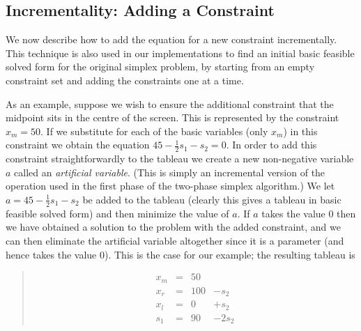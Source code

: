 \documentclass{uist96}
\begin{document}
\subsection{Incrementality: Adding a Constraint}
\label{adding-constraints}

We now describe how to add the equation for a new constraint incrementally.
This technique is also used in our implementations to find an initial basic
feasible solved form for the original simplex problem, by starting from an
empty constraint set and adding the constraints one at a time.

As an example, suppose we wish to ensure the additional constraint
that the midpoint
sits in the centre of the screen.  
This is represented by the constraint
$x_m = 50$.  If we substitute for each of the basic variables
(only $x_m$) in this constraint we obtain the equation
$45 - \frac{1}{2} s_1 - s_2 = 0$.  
In order to add this constraint
straightforwardly to the tableau we create a new 
non-negative variable $a$ called an \emph{artificial variable}.
(This is simply an incremental version of the operation used in
the first phase of the two-phase simplex algorithm.)
We let $a = 45 - \frac{1}{2} s_1 - s_2$ be added to the tableau
(clearly this gives a tableau in basic feasible solved form)
and then minimize the value of $a$.
If $a$ takes the value $0$
then we have obtained a solution to the problem
with the added constraint, and
we can then eliminate the artificial variable altogether since it is 
a parameter (and hence takes the value 0).  This is the case for our example;
the resulting tableau is
\begin{quote}\vspace*{-1ex}
$$
\begin{array}{rlrrr} 
x_m & = &50   \\
x_r & = &100 & - s_2 \\ \hline
x_l & = &0 & + s_2 \\
s_1 & = &90 & -2 s_2
\end{array}
$$
\end{quote}\vspace{-0.9ex}
\end{document}
